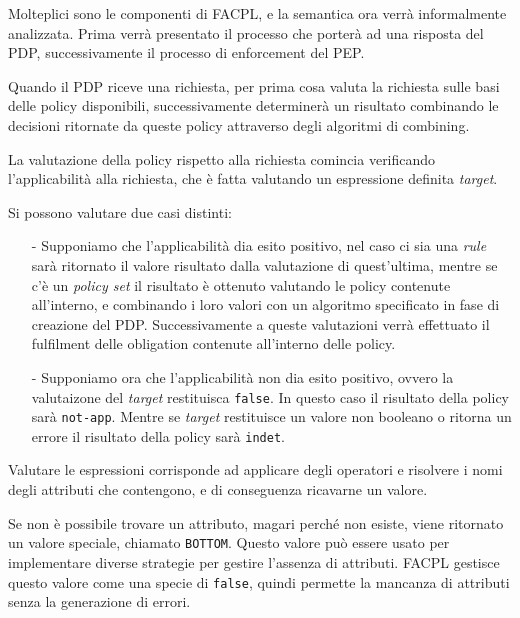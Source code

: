 Molteplici sono le componenti di FACPL, e la semantica ora verrà informalmente analizzata.\cite{fullfacpl}
Prima verrà presentato il processo che porterà ad una risposta del PDP, successivamente il processo di enforcement del PEP.\\ \par
Quando il PDP riceve una richiesta, per prima cosa valuta la richiesta sulle basi delle policy disponibili, successivamente determinerà un risultato combinando le decisioni ritornate da queste policy attraverso degli algoritmi di combining.\\ \par
La valutazione della policy rispetto alla richiesta comincia verificando l'applicabilità alla richiesta, che è fatta valutando un espressione definita \textit{target}.\\ \par
Si possono valutare due casi distinti:
\begin{itemize}
\item[-] Supponiamo che l'applicabilità dia esito positivo, nel caso ci sia una \textit{rule} sarà ritornato il valore risultato dalla valutazione di quest'ultima, mentre se c'è un \textit{policy set} il risultato è ottenuto valutando le policy contenute all'interno, e combinando i loro valori con un algoritmo specificato in fase di creazione del PDP. Successivamente a queste valutazioni verrà effettuato il fulfilment delle obligation contenute all'interno delle policy.
\item[-] Supponiamo ora che l'applicabilità non dia esito positivo, ovvero la valutaizone del \textit{target} restituisca \texttt{false}. In questo caso il risultato della policy sarà \texttt{not-app}. Mentre se \textit{target} restituisce un valore non booleano o ritorna un errore il risultato della policy sarà \texttt{indet}.
\end{itemize}
Valutare le espressioni corrisponde ad applicare degli operatori e risolvere i nomi degli attributi che contengono, e di conseguenza ricavarne un valore.\\ \par
Se non è possibile trovare un attributo, magari perché non esiste, viene ritornato un valore speciale, chiamato \texttt{BOTTOM}. Questo valore può essere usato per implementare diverse strategie per gestire l'assenza di attributi. FACPL gestisce questo valore come una specie di \texttt{false}, quindi permette la mancanza di attributi senza la generazione di errori.\\ \par
